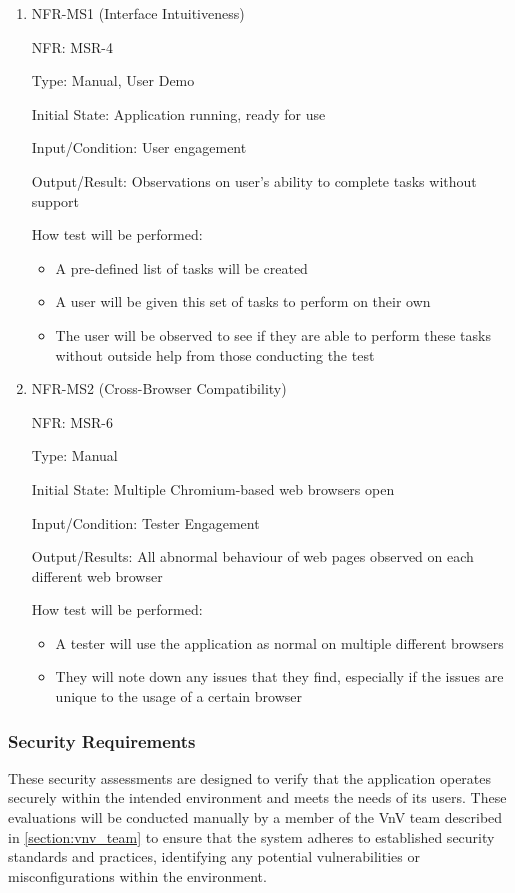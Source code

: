 \documentclass[12pt, titlepage]{article}
\begin{document}
\begin{enumerate}
\item{NFR-MS1 (Interface Intuitiveness)\\}

NFR: MSR-4 

Type: Manual, User Demo

Initial State: Application running, ready for use

Input/Condition: User engagement

Output/Result: Observations on user's ability to complete tasks without support

How test will be performed: 
\begin{itemize}
  \item  A pre-defined list of tasks will be created 
  \item A user will be given this set of tasks to perform on their own
  \item The user will be observed to see if they are able to perform these tasks
  without outside help from those conducting the test 
\end{itemize}
					
\item{NFR-MS2 (Cross-Browser Compatibility)\\}

NFR: MSR-6

Type: Manual

Initial State: Multiple Chromium-based web browsers open

Input/Condition: Tester Engagement

Output/Results: All abnormal behaviour of web pages observed on each different
web browser

How test will be performed: 
\begin{itemize}
  \item A tester will use the application as normal on multiple different
  browsers
  \item They will note down any issues that they find, especially if the issues
  are unique to the usage of a certain browser
\end{itemize}
\end{enumerate}

\subsubsection{Security Requirements}
These security assessments are designed to verify that the application operates
securely within the intended environment and meets the needs of its users. These
evaluations will be conducted manually by a member of the VnV team described in
\ref{section:vnv_team} to ensure that the system adheres to established security
standards and practices, identifying any potential vulnerabilities or
misconfigurations within the environment.
\end{document}
